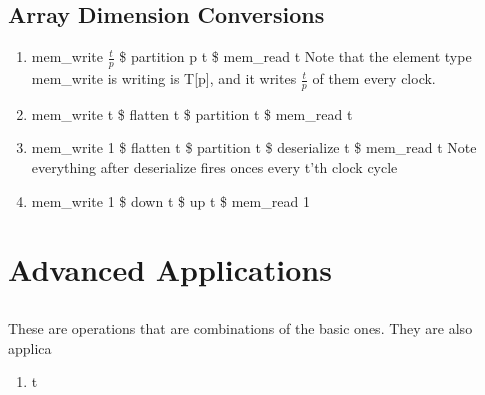 \documentclass[11pt,fleqn]{article}
\numberwithin{equation}{subsection}
\begin{document}
\subsection{Array Dimension Conversions}
\begin{enumerate}
    \item mem\_write $\frac{t}{p}$ \$ partition p t \$ mem\_read t
        \subitem Note that the element type mem\_write is writing is T[p],
        and it writes $\frac{t}{p}$ of them every clock.
    \item mem\_write t \$ flatten t \$ partition t \$ mem\_read t
    \item mem\_write 1 \$ flatten t \$ partition t \$ deserialize t \$ mem\_read t
        \subitem Note everything after deserialize fires onces every t'th clock 
        cycle
    \item mem\_write 1 \$ down t \$ up t \$ mem\_read 1
\end{enumerate}

\section{Advanced Applications}

\subsection{}
These are operations that are combinations of the basic ones. They are also
applica
\begin{enumerate}
    \item t
\end{enumerate}
\end{document}
